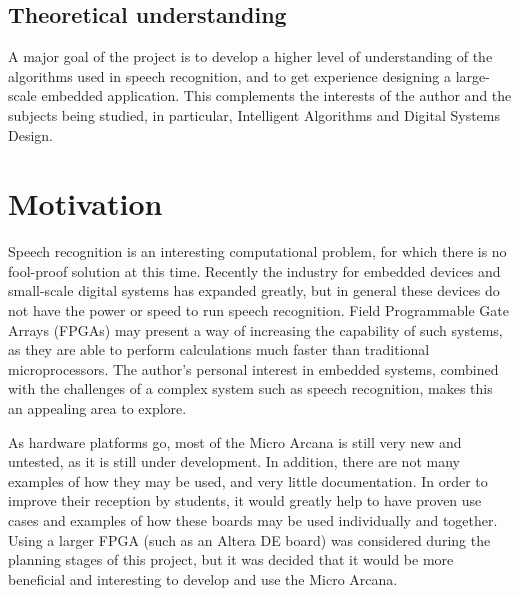 	\subsection{Theoretical understanding} %
	\label{sec:theoretical_understanding}
		A major goal of the project is to develop a higher level of understanding of the algorithms used in speech recognition, and to get experience designing a large-scale embedded application.  This complements the interests of the author and the subjects being studied, in particular, Intelligent Algorithms and Digital Systems Design.


\section{Motivation} %
\label{sec:motivation}
	Speech recognition is an interesting computational problem, for which there is no fool-proof solution at this time.  Recently the industry for embedded devices and small-scale digital systems has expanded greatly, but in general these devices do not have the power or speed to run speech recognition.  Field Programmable Gate Arrays (FPGAs) may present a way of increasing the capability of such systems, as they are able to perform calculations much faster than traditional microprocessors.  The author's personal interest in embedded systems, combined with the challenges of a complex system such as speech recognition, makes this an appealing area to explore.

	As hardware platforms go, most of the Micro Arcana is still very new and untested, as it is still under development.  In addition, there are not many examples of how they may be used, and very little documentation.  In order to improve their reception by students, it would greatly help to have proven use cases and examples of how these boards may be used individually and together.  Using a larger FPGA (such as an Altera DE board) was considered during the planning stages of this project, but it was decided that it would be more beneficial and interesting to develop and use the Micro Arcana.

